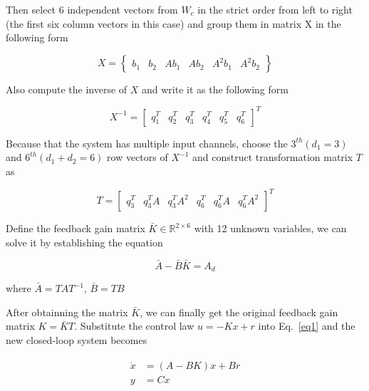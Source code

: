 \documentclass[hyperref]{article}
\theoremstyle{nonumberplain}
\begin{document}
	Then select 6 independent vectors from $W_{c}$ in the strict order from left to right (the first six column vectors in this case) and group them in matrix X in the following form
	
	\begin{equation}
	X=\begin{Bmatrix}
	b_{1} &b_{2}  &Ab_{1}  &Ab_{2}  &A^{2}b_{1}  &A^{2}b_{2} 
	\end{Bmatrix}
	\label{eq11}
	\end{equation}
	
	Also compute the inverse of $X$ and write it as the following form
	
	\begin{equation}
	X^{-1}=\begin{bmatrix}
	q_{1}^{T} & q_{2}^{T} & q_{3}^{T} & q_{4}^{T} & q_{5}^{T} & q_{6}^{T}
	\end{bmatrix}^{T}
	\label{eq12}
	\end{equation}
	
	Because that the system has multiple input channels, choose the $3^{th} (d_{1}=3)$ and $6^{th} (d_{1}+d_{2}=6)$ row vectors of $X^{-1}$ and construct transformation matrix $T$ as
	
	\begin{equation}
	T=\begin{bmatrix}
	q_{3}^{T} &q_{3}^{T}A  &q_{3}^{T}A^{2}  & q_{6}^{T} &q_{6}^{T}A  &q_{6}^{T}A^{2}
	\end{bmatrix}^{T}
	\label{eq13}
	\end{equation}
	
	Define the feedback gain matrix $\bar{K}\in \mathbb{R}^{2\times 6}$ with 12 unknown variables, we can solve it by establishing the equation
	
	\begin{equation}
	\bar{A}-\bar{B}\bar{K}=A_{d}
	\label{eq14}
	\end{equation}
	
	where $\bar{A}=TAT^{-1}$, $\bar{B}=TB$
	
	After obtainning the matrix $\bar{K}$, we can finally get the original feedback gain matrix $K=\bar{K}T$. Substitute the control law $u=-Kx+r$ into Eq.~\ref{eq1} and the new closed-loop system becomes
	
	\begin{equation}
	\begin{split}
	\begin{aligned}
	\dot{x}&=(A-BK)x+Br \\
	y&=Cx
	\label{eq15}
	\end{aligned}
	\end{split}
	\end{equation}
	
\end{document}
